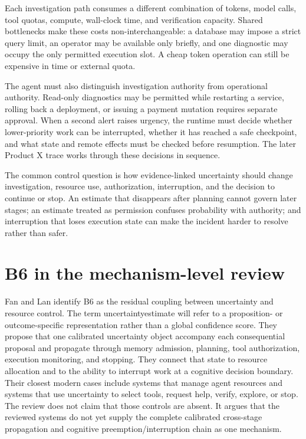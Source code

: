 Each investigation path consumes a different combination of tokens, model calls, tool quotas, compute, wall-clock time, and verification capacity. Shared bottlenecks make these costs non-interchangeable: a database may impose a strict query limit, an operator may be available only briefly, and one diagnostic may occupy the only permitted execution slot. A cheap token operation can still be expensive in time or external quota.

The agent must also distinguish investigation authority from operational authority. Read-only diagnostics may be permitted while restarting a service, rolling back a deployment, or issuing a payment mutation requires separate approval. When a second alert raises urgency, the runtime must decide whether lower-priority work can be interrupted, whether it has reached a safe checkpoint, and what state and remote effects must be checked before resumption. The later Product X trace works through these decisions in sequence.

The common control question is how evidence-linked uncertainty should change investigation, resource use, authorization, interruption, and the decision to continue or stop. An estimate that disappears after planning cannot govern later stages; an estimate treated as permission confuses probability with authority; and interruption that loses execution state can make the incident harder to resolve rather than safer.

\section{B6 in the mechanism-level review}
\label{sec:ch16-b6-review}

Fan and Lan identify B6 as the residual coupling between uncertainty and resource control. The term \gls{uncertaintyestimate} will refer to a proposition- or outcome-specific representation rather than a global confidence score. They propose that one calibrated uncertainty object accompany each consequential proposal and propagate through memory admission, planning, tool authorization, execution monitoring, and stopping. They connect that state to resource allocation and to the ability to interrupt work at a cognitive decision boundary. Their closest modern cases include systems that manage agent resources and systems that use uncertainty to select tools, request help, verify, explore, or stop. The review does not claim that those controls are absent. It argues that the reviewed systems do not yet supply the complete calibrated cross-stage propagation and cognitive preemption/interruption chain as one mechanism.

